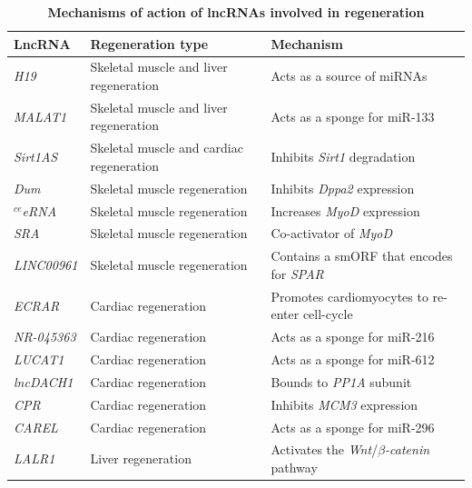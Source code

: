 \begin{table}[!htb]
  \caption[Mechanisms of action of lncRNAs involved in tissue regeneration]{\textbf{Mechanisms of action of lncRNAs involved in regeneration}}
  \begin{scriptsize}
    \begin{tabulary}{0.65\linewidth}{lll}
      \textbf{LncRNA} & \textbf{Regeneration type} & \textbf{Mechanism} \\ \hline
      \textit{H19}\autocite{dey_2014_h19} & Skeletal muscle and liver regeneration & Acts as a source of miRNAs\\
      \textit{MALAT1}\autocite{li_2017_malat1} & Skeletal muscle and liver regeneration & Acts as a sponge for miR-133\\
      \textit{Sirt1AS}\autocite{dong_2021_cardiomyocyte} & Skeletal muscle and cardiac regeneration & Inhibits \textit{Sirt1} degradation \\
      \textit{Dum}\autocite{gonccalves_2017_skeletal} & Skeletal muscle regeneration & Inhibits \textit{Dppa2} expression \\
      $^{ce}$\textit{eRNA}\autocite{gonccalves_2017_skeletal} & Skeletal muscle regeneration & Increases \textit{MyoD} expression \\
      \textit{SRA}\autocite{gonccalves_2017_skeletal} & Skeletal muscle regeneration & Co-activator of \textit{MyoD}\\
      \textit{LINC00961}\autocite{gonccalves_2017_skeletal} & Skeletal muscle regeneration & Contains a smORF that encodes for \textit{SPAR}\\
      \textit{ECRAR}\autocite{dong_2021_cardiomyocyte} & Cardiac regeneration & Promotes cardiomyocytes to re-enter cell-cycle \\
      \textit{NR-045363}\autocite{dong_2021_cardiomyocyte} & Cardiac regeneration & Acts as a sponge for miR-216\\
      \textit{LUCAT1}\autocite{dong_2021_cardiomyocyte} & Cardiac regeneration & Acts as a sponge for miR-612\\
      \textit{lncDACH1}\autocite{dong_2021_cardiomyocyte} & Cardiac regeneration & Bounds to \textit{PP1A} subunit\\
      \textit{CPR}\autocite{dong_2021_cardiomyocyte} & Cardiac regeneration & Inhibits \textit{MCM3} expression\\
      \textit{CAREL}\autocite{cai_2018_carel} & Cardiac regeneration & Acts as a sponge for miR-296\\
      \textit{LALR1}\autocite{sergeeva_2020_liver_regeneration} & Liver regeneration & Activates the \textit{Wnt}/$\beta$\textit{-catenin} pathway\\

\end{tabulary}
\end{scriptsize}
\end{table}
